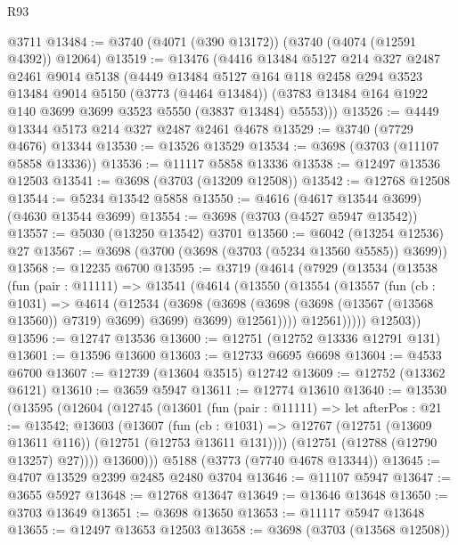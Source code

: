 \begin{lexlean}{R93}
\begin{coremodule}
    @3711
@13484 := @3740 (@4071 (@390 @13172)) (@3740 (@4074 (@12591 @4392)) @12064)
@13519 := @13476
    (@4416
      @13484
      @5127
      @214
      @327
      @2487
      @2461
      @9014
      @5138
      (@4449
        @13484
        @5127
        @164
        @118
        @2458
        @294
        @3523
        @13484
        @9014
        @5150
        (@3773 (@4464 @13484))
        (@3783 @13484 @164 @1922 @140 @3699 @3699 @3523 @5550 (@3837 @13484) @5553)))
@13526 := @4449 @13344 @5173 @214 @327 @2487 @2461 @4678
@13529 := @3740 (@7729 @4676) @13344
@13530 := @13526 @13529
@13534 := @3698 (@3703 (@11107 @5858 @13336))
@13536 := @11117 @5858 @13336
@13538 := @12497 @13536 @12503
@13541 := @3698 (@3703 (@13209 @12508))
@13542 := @12768 @12508
@13544 := @5234 @13542 @5858
@13550 := @4616 (@4617 @13544 @3699) (@4630 @13544 @3699)
@13554 := @3698 (@3703 (@4527 @5947 @13542))
@13557 := @5030 (@13250 @13542) @3701
@13560 := @6042 (@13254 @12536) @27
@13567 := @3698 (@3700 (@3698 (@3703 (@5234 @13560 @5585)) @3699))
@13568 := @12235 @6700
@13595 := @3719
    (@4614
      (@7929
        (@13534
          (@13538
            (fun (pair : @11111) =>
            @13541
              (@4614
                (@13550
                  (@13554
                    (@13557
                      (fun (cb : @1031) =>
                      @4614
                        (@12534
                          (@3698
                            (@3698 (@3698 (@3698 (@13567 (@13568 @13560)) @7319) @3699) @3699)
                            @3699)
                          @12561))))
                  @12561)))))
        @12503))
@13596 := @12747 @13536
@13600 := @12751 (@12752 @13336 @12791 @131)
@13601 := @13596 @13600
@13603 := @12733 @6695 @6698
@13604 := @4533 @6700
@13607 := @12739 (@13604 @3515) @12742
@13609 := @12752 (@13362 @6121)
@13610 := @3659 @5947
@13611 := @12774 @13610
@13640 := @13530
    (@13595
      (@12604
        (@12745
          (@13601
            (fun (pair : @11111) =>
            let afterPos : @21 := @13542;
            @13603
              (@13607
                (fun (cb : @1031) =>
                @12767 (@12751 (@13609 @13611 @116)) (@12751 (@12753 @13611 @131))))
              (@12751 (@12788 (@12790 @13257) @27))))
          @13600)))
    @5188
    (@3773 (@7740 @4678 @13344))
@13645 := @4707 @13529 @2399 @2485 @2480 @3704
@13646 := @11107 @5947
@13647 := @3655 @5927
@13648 := @12768 @13647
@13649 := @13646 @13648
@13650 := @3703 @13649
@13651 := @3698 @13650
@13653 := @11117 @5947 @13648
@13655 := @12497 @13653 @12503
@13658 := @3698 (@3703 (@13568 @12508))

\end{coremodule}
\end{lexlean}
